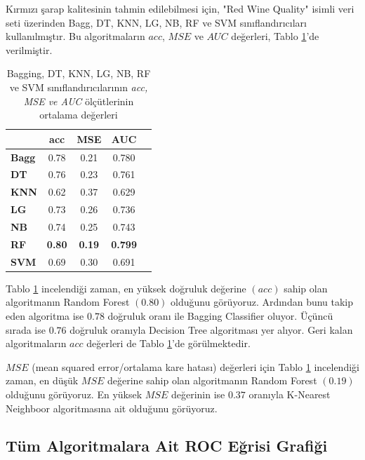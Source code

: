 \documentclass[conference]{IEEEtran}
\begin{document}
\quad Kırmızı şarap kalitesinin tahmin edilebilmesi için, "Red Wine Quality"\cite{4} isimli veri seti üzerinden Bagg, DT, KNN, LG, NB, RF ve SVM sınıflandırıcıları kullanılmıştır. Bu algoritmaların $acc$, $MSE$ ve $AUC$ değerleri, Tablo \ref{tbl:01}'de verilmiştir.

\begin{table}[h]
	\centering
	\small
	\begin{tabular}{|l|c|c|c|c|}
		\hline
					& \textbf{acc}	& \textbf{MSE}	& \textbf{AUC}	\\ \hline
		\textbf{Bagg}	& 0.78		& 0.21		& 0.780		\\ \hline
		\textbf{DT}		& 0.76		& 0.23 		& 0.761		\\ \hline
		\textbf{KNN}	& 0.62		& 0.37 		& 0.629		\\ \hline
		\textbf{LG}		& 0.73		& 0.26		& 0.736		\\ \hline
		\textbf{NB}		& 0.74		& 0.25		& 0.743		\\ \hline
		\textbf{RF}		& \textbf{0.80}	& \textbf{0.19}	& \textbf{0.799}	\\ \hline
		\textbf{SVM}	& 0.69		& 0.30		& 0.691		\\ \hline
	\end{tabular}
	\caption{Bagging, DT, KNN, LG, NB, RF ve SVM sınıflandırıcılarının \textit{acc, MSE ve AUC} ölçütlerinin ortalama değerleri}
	\label{tbl:01}
\end{table}

\quad Tablo \ref{tbl:01} incelendiği zaman, en yüksek doğruluk değerine $(acc)$ sahip olan algoritmanın Random Forest $(0.80)$ olduğunu görüyoruz. Ardından bunu takip eden algoritma ise $0.78$ doğruluk oranı ile Bagging Classifier oluyor. Üçüncü sırada ise $0.76$ doğruluk oranıyla Decision Tree algoritması yer alıyor. Geri kalan algoritmaların $acc$ değerleri de Tablo \ref{tbl:01}'de görülmektedir.

\quad $MSE$ (mean squared error/ortalama kare hatası) değerleri için Tablo \ref{tbl:01} incelendiği zaman, en düşük $MSE$ değerine sahip olan algoritmanın Random Forest $(0.19)$ olduğunu görüyoruz. En yüksek $MSE$ değerinin ise $0.37$ oranıyla K-Nearest Neighboor algoritmasına ait olduğunu görüyoruz.

\pagebreak

\subsection{\textbf{Tüm Algoritmalara Ait ROC Eğrisi Grafiği}}
\end{document}
